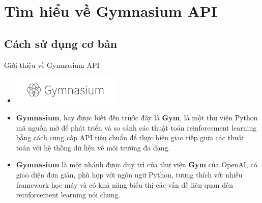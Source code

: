 \documentclass[10pt,aspectratio=169]{beamer}
\begin{document}
\section{Tìm hiểu về Gymnasium API}

\subsection{Cách sử dụng cơ bản}

\begin{frame}{Giới thiệu về Gymnasium API}
\begin{itemize}
\setlength\itemsep{8pt}
\item[] \begin{center}
\includegraphics[width=0.4\textwidth]{source/gymnasium-text.png}
\end{center}
\item \textcolor{mainblue}{\textbf{Gymnasium}}, hay được biết đến trước đây là \textcolor{mainblue}{\textbf{Gym}}, là một thư viện Python mã nguồn mở để phát triển và so sánh các thuật toán reinforcement learning bằng cách cung cấp API tiêu chuẩn để thực hiện giao tiếp giữa các thuật toán với hệ thống dữ liệu về môi trường đa dạng.
\item \textcolor{mainblue}{\textbf{Gymnasium}} là một nhánh được duy trì của thư viện \textcolor{mainblue}{\textbf{Gym}} của OpenAI\footnotemark, có giao diện đơn giản, phù hợp với ngôn ngữ Python, tương thích với nhiều framework học máy và có khả năng biểu thị các vấn đề liên quan đến reinforcement learning nói chung.
\end{itemize}
\end{frame}
\end{document}
